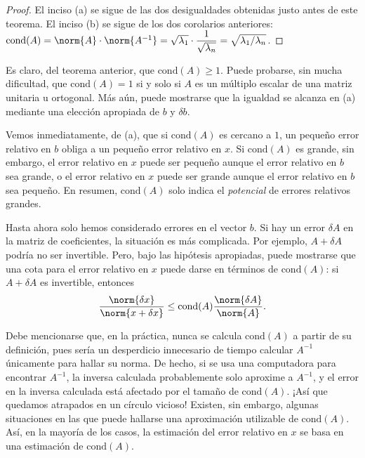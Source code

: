 \begin{proof}
    El inciso (a) se sigue de las dos desigualdades obtenidas justo antes de este teorema. El inciso (b) se sigue de los dos corolarios anteriores: $\mathrm{cond}(A)=\norm{A}\cdot\norm{A^{-1}}=\sqrt{\lambda_1}\cdot\dfrac{1}{\sqrt{\lambda_n}}=\sqrt{\lambda_1/\lambda_n}$.
\end{proof}

Es claro, del teorema anterior, que $\mathrm{cond}(A)\geq 1$. Puede probarse, sin mucha dificultad, que $\mathrm{cond}(A)=1$ si y solo si $A$ es un múltiplo escalar de una matriz unitaria u ortogonal. Más aún, puede mostrarse que la igualdad se alcanza en (a) mediante una elección apropiada de $b$ y $\delta b$.

Vemos inmediatamente, de (a), que si $\mathrm{cond}(A)$ es cercano a $1$, un pequeño error relativo en $b$ obliga a un pequeño error relativo en $x$. Si $\mathrm{cond}(A)$ es grande, sin embargo, el error relativo en $x$ puede ser pequeño aunque el error relativo en $b$ sea grande, o el error relativo en $x$ puede ser grande aunque el error relativo en $b$ sea pequeño. En resumen, $\mathrm{cond}(A)$ solo indica el \textit{potencial} de errores relativos grandes.

Hasta ahora solo hemos considerado errores en el vector $b$. Si hay un error $\delta A$ en la matriz de coeficientes, la situación es más complicada. Por ejemplo, $A+\delta A$ podría no ser invertible. Pero, bajo las hipótesis apropiadas, puede mostrarse que una cota para el error relativo en $x$ puede darse en términos de $\mathrm{cond}(A)$: si $A+\delta A$ es invertible, entonces
\begin{equation*}
    \frac{\norm{\delta x}}{\norm{x+\delta x}}\leq\mathrm{cond}(A)\frac{\norm{\delta A}}{\norm{A}}.
\end{equation*}

Debe mencionarse que, en la práctica, nunca se calcula $\mathrm{cond}(A)$ a partir de su definición, pues sería un desperdicio innecesario de tiempo calcular $A^{-1}$ únicamente para hallar su norma. De hecho, si se usa una computadora para encontrar $A^{-1}$, la inversa calculada probablemente solo aproxime a $A^{-1}$, y el error en la inversa calculada está afectado por el tamaño de $\mathrm{cond}(A)$. ¡Así que quedamos atrapados en un círculo vicioso! Existen, sin embargo, algunas situaciones en las que puede hallarse una aproximación utilizable de $\mathrm{cond}(A)$. Así, en la mayoría de los casos, la estimación del error relativo en $x$ se basa en una estimación de $\mathrm{cond}(A)$.

